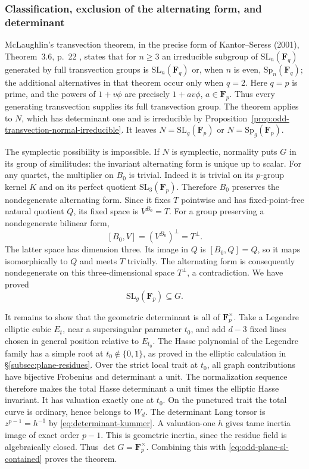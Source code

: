 \subsubsection{Classification, exclusion of the alternating form, and determinant}

McLaughlin's transvection theorem, in the precise form of
Kantor--Seress (2001), Theorem~3.6, p.~22 \cite{KantorSeress2001},
states that for $n\geq3$
an irreducible subgroup of $\mathrm{SL}_n(\mathbf F_q)$ generated by
full transvection groups is $\mathrm{SL}_n(\mathbf F_q)$ or, when
$n$ is even, $\mathrm{Sp}_n(\mathbf F_q)$; the additional alternatives
in that theorem occur only when $q=2$.  Here $q=p$ is prime, and
the powers of $1+v\phi$ are precisely $1+a v\phi$, $a\in\mathbf F_p$.
Thus every generating transvection supplies its full transvection
group.  The theorem applies to $N$, which has determinant one and
is irreducible by Proposition~\ref{prop:odd-transvection-normal-irreducible}.
It leaves $N=\mathrm{SL}_g(\mathbf F_p)$ or $N=\mathrm{Sp}_g(\mathbf F_p)$.

The symplectic possibility is impossible.  If $N$ is symplectic,
normality puts $G$ in its group of similitudes: the invariant
alternating form is unique up to scalar.  For any quartet, the
multiplier on $B_0$ is trivial.  Indeed it is trivial on its
$p$-group kernel $K$ and on its perfect quotient
$\mathrm{SL}_3(\mathbf F_p)$.  Therefore $B_0$ preserves the
nondegenerate alternating form.  Since it fixes $T$ pointwise and
has fixed-point-free natural quotient $Q$, its fixed space is
$V^{B_0}=T$.  For a group preserving a nondegenerate bilinear form,
\[
 [B_0,V]=(V^{B_0})^\perp=T^\perp.
\]
The latter space has dimension three.  Its image in $Q$ is
$[B_0,Q]=Q$, so it maps isomorphically to $Q$ and meets $T$ trivially.
The alternating form is consequently nondegenerate on this
three-dimensional space $T^\perp$, a contradiction.  We have proved
\begin{equation}\label{eq:odd-plane-sl-contained}
 \mathrm{SL}_g(\mathbf F_p)\subseteq G.
\end{equation}

It remains to show that the geometric determinant is all of
$\mathbf F_p^\times$.  Take a Legendre elliptic cubic $E_t$, near a
supersingular parameter $t_0$, and add $d-3$ fixed lines chosen in
general position relative to $E_{t_0}$.  The Hasse polynomial of
the Legendre family has a simple root at $t_0\notin\{0,1\}$, as
proved in the elliptic calculation in
\S\ref{subsec:plane-residues}.  Over the strict local
trait at $t_0$, all graph contributions have bijective Frobenius
and determinant a unit.  The normalization sequence therefore
makes the total Hasse determinant a unit times the elliptic Hasse
invariant.  It has valuation exactly one at $t_0$.
On the punctured trait the total curve is ordinary, hence belongs
to $W_d$.  The determinant Lang torsor is
$z^{p-1}=h^{-1}$ by \eqref{eq:determinant-kummer}.  A valuation-one
$h$ gives tame inertia image of exact order $p-1$.  This is
geometric inertia, since the residue field is algebraically closed.
Thus $\det G=\mathbf F_p^\times$.  Combining this with
\eqref{eq:odd-plane-sl-contained} proves the theorem.

